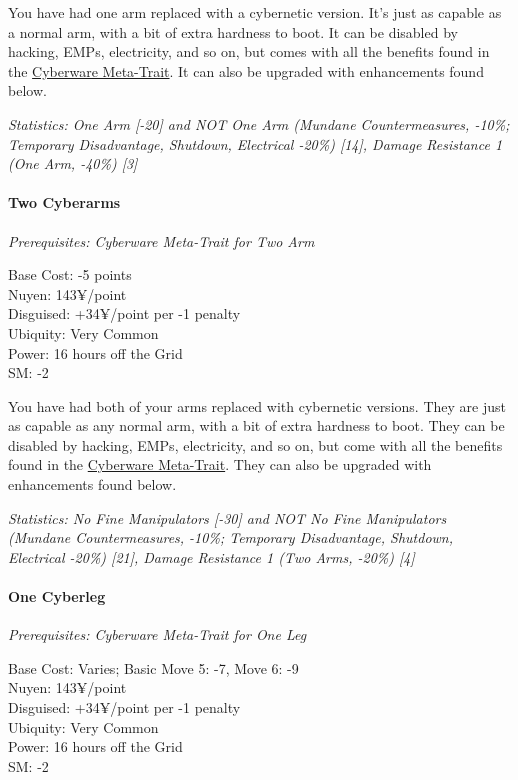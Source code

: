 \begin{multicols*}{3}
	You have had one arm replaced with a cybernetic version. It's just as capable as a normal arm, with a bit of extra hardness to boot. It can be disabled by hacking, EMPs, electricity, and so on, but comes with all the benefits found in the \hyperref[cyberware-meta-trait]{Cyberware Meta-Trait}. It can also be upgraded with enhancements found below.
	
	\textit{\textcolor{OliveGreen}{Statistics: One Arm [-20] and NOT One Arm (Mundane Countermeasures, -10\%; Temporary Disadvantage, Shutdown, Electrical -20\%) [14], Damage Resistance 1 (One Arm, -40\%) [3]}}
	
	\paragraph{Two Cyberarms}
	\textit{Prerequisites:  Cyberware Meta-Trait for Two Arm}
	\begin{flushright}
		Base Cost: -5 points\\
		Nuyen: 143¥/point\\
		Disguised: +34¥/point per -1 penalty\\
		Ubiquity: Very Common\\
		Power: 16 hours off the Grid\\
		SM: -2
	\end{flushright}
	
	You have had both of your arms replaced with cybernetic versions. They are just as capable as any normal arm, with a bit of extra hardness to boot. They can be disabled by hacking, EMPs, electricity, and so on, but come with all the benefits found in the \hyperref[cyberware-meta-trait]{Cyberware Meta-Trait}. They can also be upgraded with enhancements found below.
	
	\textit{\textcolor{OliveGreen}{Statistics:  No Fine Manipulators [-30] and NOT No Fine Manipulators (Mundane Countermeasures, -10\%; Temporary Disadvantage, Shutdown, Electrical -20\%) [21], Damage Resistance 1 (Two Arms, -20\%) [4]}}
			
	\paragraph{One Cyberleg}
	\textit{Prerequisites:  Cyberware Meta-Trait for One Leg}
	\begin{flushright}
		Base Cost: Varies; Basic Move 5: -7, Move 6: -9\\
		Nuyen: 143¥/point\\
		Disguised: +34¥/point per -1 penalty\\
		Ubiquity: Very Common\\
		Power: 16 hours off the Grid\\
		SM: -2
	\end{flushright}
	

\end{multicols*}
